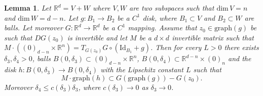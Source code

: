 \documentclass[11pt, leqno]{amsart}
\newtheorem{lem}[thm]{Lemma}
\theoremstyle{definition}
\def\R{\mathbb{R}}
\begin{document}
	 		 	\begin{lem}\label{lem:transport_disks} Let $\R^d=V+W$ where $V,W$ are two subspaces such that $\text{dim}\, V = n$ and $\text{dim}\, W = d-n$.  Let $g:B_1\to B_2$ be a $C^1$  disk, where $B_1\subset V$ and $B_2 \subset W$ are balls.  
	 		Let moreover $G:\R^d\to \R^d$ be a $C^1$ mapping.  Assume that $z_0\in \text{graph}(g)$ be such that $DG(z_0)$ is invertible and let $M$ be a $d\times d$  invertible matrix such that $M\cdot((0)_{d-n}\times \R^n) = T_{G(z_0)}G\circ (\textrm{Id}_{B_1}+g)$. Then for every $L>0$ there exists  $\delta_3, \delta_4>0$, balls $B(0,\delta_3)\subset  (0)_{d-n} \times \R^n$, $B(0,\delta_4)\subset \R^{d-n} \times (0)_n$ and the  disk $h:B(0,\delta_3)\to B(0,\delta_4)$ with the Lipschitz constant  $L$ such that 
	 		$$
	 		M \cdot \text{graph}(h) \subset G(\text{graph}(g))-G(z_0).
	 		$$
	 		Moreover $\delta_4\leq c(\delta_3)\delta_3$, where $c(\delta_3)\to 0$ as $\delta_3\to 0$. 
	 	\end{lem}
\end{document}

